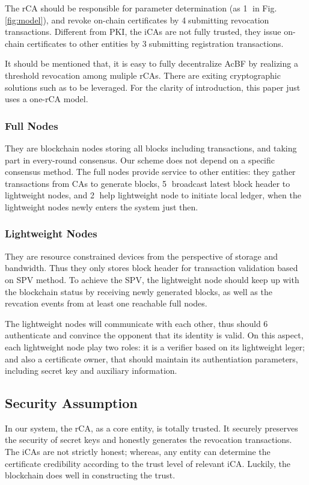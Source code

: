 \documentclass[conference]{IEEEtran}
\begin{document}
 The rCA should be responsible for parameter determination (as \textcircled{1} in Fig. \ref{fig:model}), and revoke on-chain certificates by \textcircled{4}submitting revocation transactions. Different from PKI, the iCAs are not fully trusted, they issue on-chain certificates to other entities by \textcircled{3}submitting registration transactions. 

It should be mentioned that, it is easy to fully decentralize AcBF by realizing a threshold revocation among muliple rCAs. There are exiting cryptographic solutions such as \cite{Gennaro2019FullyDG} to be leveraged. 
For the clarity of introduction, this paper just uses a one-rCA model. 

\subsubsection{Full Nodes}
They are blockchain nodes storing all blocks including transactions, and taking part in every-round consensus. Our scheme does not depend on a specific consensus method. The full nodes provide service to other entities: they gather transactions from CAs to generate blocks, \textcircled{5} broadcast latest block header to lightweight nodes, and \textcircled{2} help lightweight node to initiate local ledger,  when the lightweight nodes newly enters the system just then. 

\subsubsection{Lightweight Nodes}
They are resource constrained devices from the perspective of storage and bandwidth. Thus they only stores block header for transaction validation based on SPV method. 
To achieve the SPV, the lightweight node should keep up with the blockchain status by receiving newly generated blocks, as well as the revcation events from at least one reachable full nodes. 

The lightweight nodes will communicate with each other, thus should \textcircled{6} authenticate and convince the opponent that its identity is valid. On this aspect, each lightweight node play two roles: it is a verifier based on its lightweight leger; and also a certificate owner, that should maintain its authentiation parameters, including secret key and auxiliary information.

\subsection{Security Assumption}
In our system, the rCA, as a core entity, is totally trusted. It securely preserves the security of secret keys and honestly generates the revocation transactions. The iCAs are not strictly honest; whereas, any entity can determine the certificate credibility according to the trust level of relevant iCA. Luckily, the blockchain does well in constructing the trust. 
\end{document}

